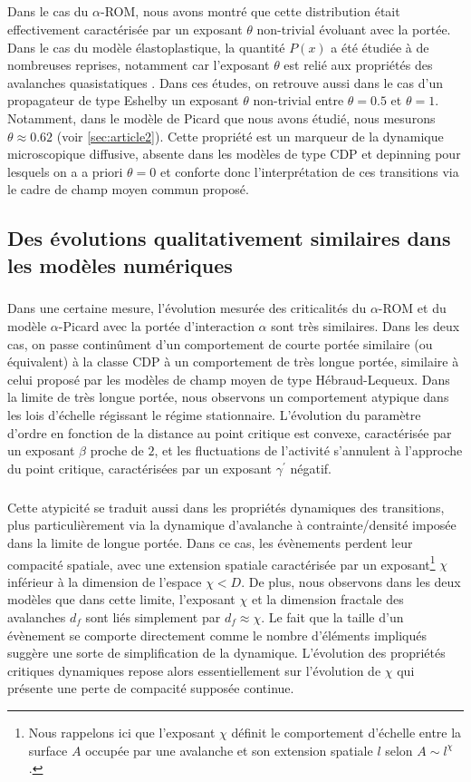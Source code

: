 \subparagraph{}Dans le cas du $\alpha$-ROM, nous avons montré que cette distribution était effectivement caractérisée par un exposant $\theta$ non-trivial évoluant avec la portée. Dans le cas du modèle élastoplastique, la quantité $P(x)$ a été étudiée à de nombreuses reprises, notamment car l'exposant $\theta$ est relié aux propriétés des avalanches quasistatiques \cite{lin_scaling_2014, ferrero_criticality_2019, liu_driving_2016, lin_mean-field_2016}. Dans ces études, on retrouve aussi dans le cas d'un propagateur de type Eshelby un exposant $\theta$ non-trivial entre $\theta = 0.5$ et $\theta = 1$. Notamment, dans le modèle de Picard que nous avons étudié, nous mesurons $\theta \approx 0.62$ (voir \autoref{sec:article2}). Cette propriété est un marqueur de la dynamique microscopique diffusive, absente dans les modèles de type CDP et depinning pour lesquels on a a priori $\theta = 0$ \cite{lin_scaling_2014} et conforte donc l'interprétation de ces transitions via le cadre de champ moyen commun proposé.

\subsection{Des évolutions qualitativement similaires dans les modèles numériques}

\subparagraph{}Dans une certaine mesure, l'évolution mesurée des criticalités du $\alpha$-ROM et du modèle $\alpha$-Picard avec la portée d'interaction $\alpha$ sont très similaires. Dans les deux cas, on passe continûment d'un comportement de courte portée similaire (ou équivalent) à la classe CDP à un comportement de très longue portée, similaire à celui proposé par les modèles de champ moyen de type Hébraud-Lequeux. Dans la limite de très longue portée, nous observons un comportement atypique dans les lois d'échelle régissant le régime stationnaire. L'évolution du paramètre d'ordre en fonction de la distance au point critique est convexe, caractérisée par un exposant $\beta$ proche de $2$, et les fluctuations de l'activité s'annulent à l'approche du point critique, caractérisées par un exposant $\gamma^\prime$ négatif.

\subparagraph{}Cette atypicité se traduit aussi dans les propriétés dynamiques des transitions, plus particulièrement via la dynamique d'avalanche à contrainte/densité imposée dans la limite de longue portée. Dans ce cas, les évènements perdent leur compacité spatiale, avec une extension spatiale caractérisée par un exposant\footnote{Nous rappelons ici que l'exposant $\chi$ définit le comportement d'échelle entre la surface $A$ occupée par une avalanche et son extension spatiale $l$ selon $A\sim l^\chi$.} $\chi$ inférieur à la dimension de l'espace $\chi < D$. De plus, nous observons dans les deux modèles que dans cette limite, l'exposant $\chi$ et la dimension fractale des avalanches $d_f$ sont liés simplement par $d_f\approx \chi$. Le fait que la taille d'un évènement se comporte directement comme le nombre d'éléments impliqués suggère une sorte de simplification de la dynamique. L'évolution des propriétés critiques dynamiques repose alors essentiellement sur l'évolution de $\chi$ qui présente une perte de compacité supposée continue.

